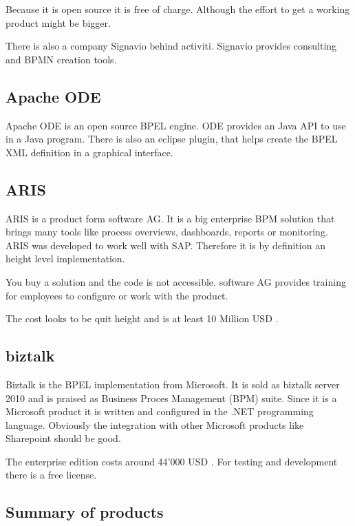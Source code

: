\documentclass[paper=a4,twoside=false,BCOR=0mm,DIV=calc,fontsize=12pt]{scrartcl}
\begin{document}
Because it is open source it is free of charge. Although the effort to get a working product might be bigger. 

There is also a company Signavio \cite{signavio} behind activiti. Signavio provides consulting and BPMN creation tools.

\subsection{Apache ODE}
Apache ODE \cite{appacheODE} is an open source BPEL engine. ODE provides an Java API to use in a Java program.
There is also an eclipse plugin, that helps create the BPEL XML definition in a graphical interface.


\subsection{ARIS}
ARIS \cite{aris} is a product form software AG. It is a big enterprise BPM solution that brings many tools like process overviews, dashboards, reports or monitoring. ARIS was developed to work well with SAP. Therefore it is by definition an height level implementation.

You buy a solution and the code is not accessible. software AG provides training for employees to configure or work with the product. 

The cost looks to be quit height and is at least 10 Million USD \cite{ariscost}.


\subsection{biztalk}
Biztalk \cite{biztalk} is the BPEL implementation from Microsoft. It is sold as biztalk server 2010 and is praised as Business Proces Management (BPM) suite. Since it is a Microsoft product it is written and configured in the .NET programming language. Obviously the integration with other Microsoft products like Sharepoint should be good.

The enterprise edition costs around 44'000 USD \cite{biztalkcost}. For testing and development there is a free license.


\subsection{Summary of products}
\end{document}
